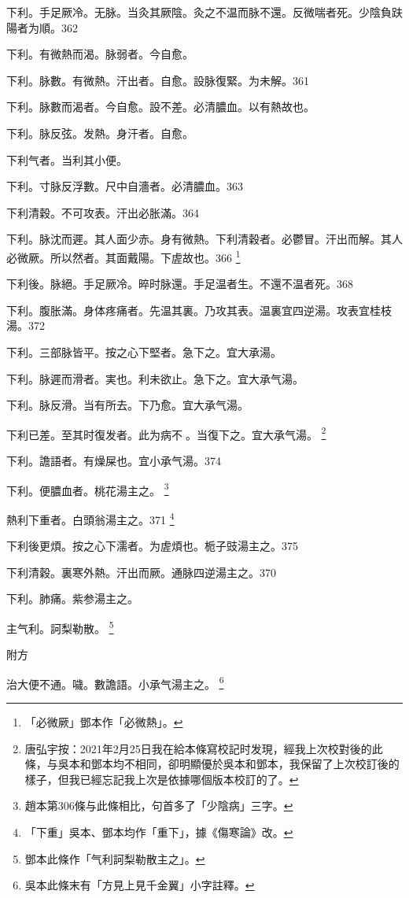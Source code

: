 下利。手足厥{\khaai 冷}。无脉。{\khaai 当灸其厥陰。}灸之不温{\khaai 而脉不還}。反微喘者死。少陰負趺陽者为順。362

下利。有微熱而渴。脉弱者。今自愈。

下利。脉數。有微熱。汗出者。自愈。設{\khaai 脉}復緊。为未解。361

下利。脉數而渴者。今自愈。設不差。必清膿血。以有熱故也。

下利。脉反弦。发熱。身汗者。自愈。

下利气者。当利其小便。

下利。寸脉反浮數。尺中自濇者。必清膿血。363

下利清穀。不可攻表。汗出必胀滿。364

下利。脉沈而遲。其人面少赤。身有微熱。下利清穀者。必鬱冒。汗出而解。其人必微厥。所以然者。其面戴陽。下虗故也。366
	\footnote{
		「必微厥」鄧本作「必微熱」。
	}

下利後。脉絕。手足厥{\khaai 冷}。晬时脉還。手足温者生。不還{\khaai 不温}者死。368

下利。腹{\khaai 胀}滿。身体疼痛者。先温其裏。乃攻其表。温裏宜四逆湯。攻表宜桂枝湯。372

下利。三部脉皆平。按之心下堅者。急下之。宜大承湯。

下利。脉遲而滑者。実也。利未欲止。急下之。宜大承气湯。

下利。脉反滑。当有所去。下乃愈。宜大承气湯。

下利{\khaai 已}差。至其时復发者。此为病不{\sungii 𥁞}。当{\khaai 復}下之。宜{\khaai 大}承气湯。
	\footnote{
		唐弘宇按：2021年2月25日我在給本條寫校記时发現，經我上次校對後的此條，与吳本和鄧本均不相同，卻明顯優於吳本和鄧本，我保留了上次校訂後的樣子，但我已經忘記我上次是依據哪個版本校訂的了。
	}

下利。譫語者。有燥屎也。宜{\khaai 小}承气湯。374

下利。便膿血者。桃花湯主之。
	\footnote{
		趙本第306條与此條相比，句首多了「少陰病」三字。
	}

熱利下重者。白頭翁湯主之。371
	\footnote{
		「下重」吳本、鄧本均作「重下」，據《傷寒論》改。
	}

下利後更煩。按之心下濡者。为虗煩也。栀子{\khaai 豉}湯主之。375

下利清穀。裏寒外熱。汗出而厥。通脉四逆湯主之。370

下利。肺痛。紫参湯主之。

主气利。訶梨勒散。
	\footnote{
		鄧本此條作「气利訶梨勒散主之」。
	}

附方

治大便不通。噦。數譫語。小承气湯主之。
	\footnote{
		吳本此條末有「方見上見千金翼」小字註釋。
	}

